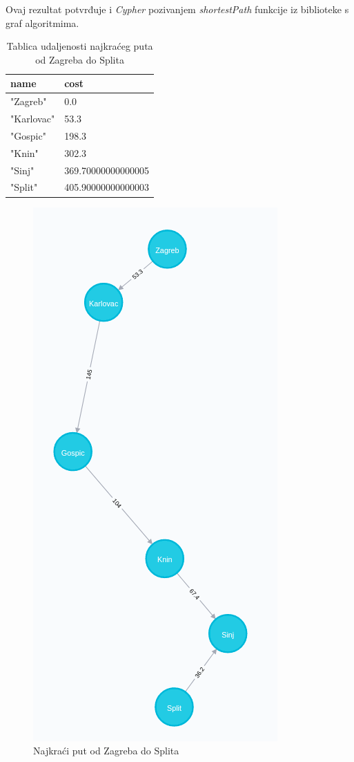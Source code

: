 \documentclass[10pt]{scrartcl}
\begin{document}
Ovaj rezultat potvrđuje i \emph{Cypher} pozivanjem \emph{shortestPath} funkcije iz biblioteke s graf algoritmima.

\begin{table}[H]
\centering
\caption{Tablica udaljenosti najkraćeg puta od Zagreba do Splita}
\begin{tabular}{|l|l|}
\hline
\textbf{name} & \textbf{cost}      \\ \hline
"Zagreb"      & 0.0                \\ \hline
"Karlovac"    & 53.3               \\ \hline
"Gospic"      & 198.3              \\ \hline
"Knin"        & 302.3              \\ \hline
"Sinj"        & 369.70000000000005 \\ \hline
"Split"       & 405.90000000000003 \\ \hline
\end{tabular}
\end{table}

\begin{figure}[H]
    \centering
    \includegraphics[scale=0.25]{zg-st}
    \caption{Najkraći put od Zagreba do Splita}
\end{figure}
\end{document}
